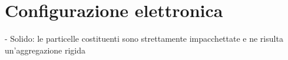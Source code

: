 \section{Configurazione elettronica}
- Solido: le particelle costituenti sono strettamente impacchettate e ne risulta un'aggregazione rigida
